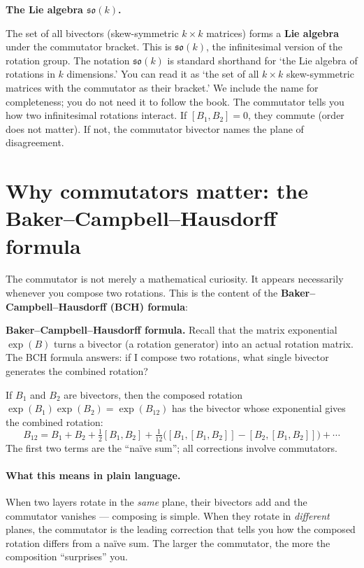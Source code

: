 \documentclass[11pt, twoside, openright]{memoir}
\begin{document}
\begin{gabox}
\textbf{The Lie algebra $\mathfrak{so}(k)$.}

The set of all bivectors (skew-symmetric $k \times k$ matrices) forms a
\textbf{Lie algebra} under the commutator bracket.  This is
$\mathfrak{so}(k)$, the infinitesimal version of the rotation group.
The notation $\mathfrak{so}(k)$ is standard shorthand for `the Lie algebra of rotations in $k$ dimensions.' You can read it as `the set of all $k \times k$ skew-symmetric matrices with the commutator as their bracket.' We include the name for completeness; you do not need it to follow the book.
The commutator tells you how two infinitesimal rotations interact.  If
$[B_1, B_2] = 0$, they commute (order does not matter).  If not, the
commutator bivector names the plane of disagreement.
\end{gabox}

\section{Why commutators matter: the Baker--Campbell--Hausdorff formula}

The commutator is not merely a mathematical curiosity.  It appears
necessarily whenever you compose two rotations.  This is the content of
the \textbf{Baker--Campbell--Hausdorff (BCH) formula}:

\begin{gabox}
\textbf{Baker--Campbell--Hausdorff formula.}
Recall that the matrix exponential $\exp(B)$ turns a bivector (a rotation generator) into an actual rotation matrix. The BCH formula answers: if I compose two rotations, what single bivector generates the combined rotation?

If $B_1$ and $B_2$ are bivectors, then the composed rotation
$\exp(B_1)\exp(B_2) = \exp(B_{12})$ has the bivector whose exponential gives the combined rotation:
\[
  B_{12} = B_1 + B_2 + \tfrac{1}{2}[B_1, B_2]
    + \tfrac{1}{12}\bigl([B_1, [B_1, B_2]] - [B_2, [B_1, B_2]]\bigr)
    + \cdots
\]
The first two terms are the ``na\"ive sum''; all corrections involve
commutators.
\end{gabox}

\paragraph{What this means in plain language.}
When two layers rotate in the \emph{same} plane, their bivectors add
and the commutator vanishes --- composing is simple.  When they rotate
in \emph{different} planes, the commutator is the leading correction
that tells you how the composed rotation differs from a na\"ive sum.
The larger the commutator, the more the composition ``surprises'' you.
\end{document}
